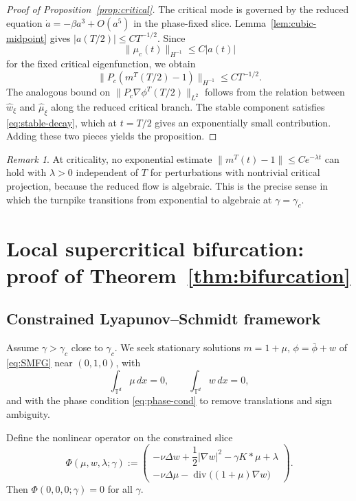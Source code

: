 \documentclass[11pt]{amsart}
\theoremstyle{definition}
\theoremstyle{remark}
\newtheorem{remark}[theorem]{Remark}
\newcommand{\Td}{\mathbb{T}^d}
\newcommand{\phiT}{\phi^T}
\newcommand{\mT}{m^T}
\newcommand{\bphi}{\bar{\phi}}
\newcommand{\gamc}{\gamma_c}
\newcommand{\Div}{\operatorname{div}}
\newcommand{\grad}{\nabla}
\begin{document}
\begin{proof}[Proof of Proposition~\ref{prop:critical}]
The critical mode is governed by the reduced equation $\dot a=-\beta a^3+O(a^5)$ in the phase-fixed slice. Lemma~\ref{lem:cubic-midpoint} gives $|a(T/2)|\le CT^{-1/2}$. Since
\[
\|\mu_c(t)\|_{H^{-1}}\le C|a(t)|
\]
for the fixed critical eigenfunction, we obtain
\[
\|P_c(\mT(T/2)-1)\|_{H^{-1}}
\le C T^{-1/2}.
\]
The analogous bound on $\|P_c\nabla \phiT(T/2)\|_{L^2}$ follows from the relation between $\widehat w_\xi$ and $\widehat\mu_\xi$ along the reduced critical branch. The stable component satisfies \eqref{eq:stable-decay}, which at $t=T/2$ gives an exponentially small contribution. Adding these two pieces yields the proposition.
\end{proof}

\begin{remark}
At criticality, no exponential estimate $\|\mT(t)-1\|\le Ce^{-\lambda t}$ can hold with $\lambda>0$ independent of $T$ for perturbations with nontrivial critical projection, because the reduced flow is algebraic. This is the precise sense in which the turnpike transitions from exponential to algebraic at $\gamma=\gamc$.
\end{remark}

\section{Local supercritical bifurcation: proof of Theorem~\ref{thm:bifurcation}}
\label{sec:bifurcation-proof}

\subsection{Constrained Lyapunov--Schmidt framework}
\label{sub:LS-setup}

Assume $\gamma>\gamc$ close to $\gamc$. We seek stationary solutions $m=1+\mu$, $\phi=\bphi+w$ of \eqref{eq:SMFG} near $(0,1,0)$, with
\[
\int_{\Td}\mu\,dx=0,\qquad \int_{\Td}w\,dx=0,
\]
and with the phase condition \eqref{eq:phase-cond} to remove translations and sign ambiguity.

Define the nonlinear operator on the constrained slice
\begin{equation}
\label{eq:Phi}
\Phi(\mu,w,\lambda;\gamma) :=
\begin{pmatrix}
-\nu\Delta w+\dfrac12|\grad w|^2-\gamma K*\mu+\lambda\\[3pt]
-\nu\Delta\mu-\Div\bigl((1+\mu)\grad w\bigr)
\end{pmatrix}.
\end{equation}
Then $\Phi(0,0,0;\gamma)=0$ for all $\gamma$.
\end{document}

